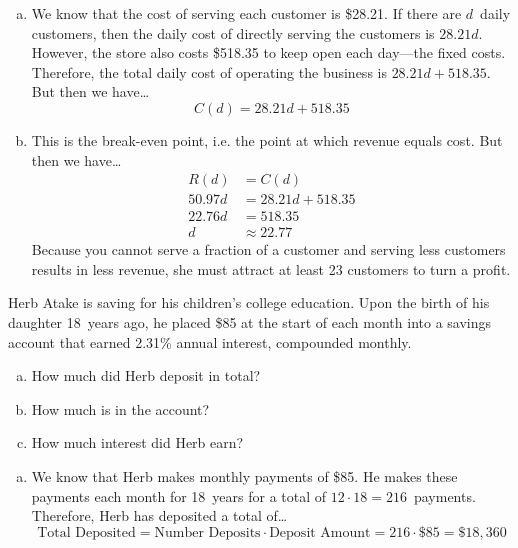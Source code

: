 \documentclass[12pt,letterpaper]{exam}
\begin{document}
\begin{questions}
{\begin{enumerate}[(a)]
\item We know that the cost of serving each customer is \$28.21. If there are $d$~daily customers, then the daily cost of directly serving the customers is $28.21d$. However, the store also costs \$518.35 to keep open each day---the fixed costs. Therefore, the total daily cost of operating the business is $28.21d + 518.35$. But then we have\dots
	\[
	C(d)= 28.21d + 518.35
	\] \pspace

\item This is the break-even point, i.e. the point at which revenue equals cost. But then we have\dots
	\[
	\begin{aligned}
	R(d)&= C(d) \\[0.3cm]
	50.97d&= 28.21d + 518.35 \\[0.3cm]
	22.76d&= 518.35 \\[0.3cm]
	d&\approx 22.77
	\end{aligned}
	\]
Because you cannot serve a fraction of a customer and serving less customers results in less revenue, she must attract at least 23 customers to turn a profit. 
\end{enumerate}
}



\newpage
\question[10] Herb Atake is saving for his children's college education. Upon the birth of his daughter 18~years ago, he placed \$85 at the start of each month into a savings account that earned 2.31\% annual interest, compounded monthly. 
	\begin{enumerate}[(a)]
	\item How much did Herb deposit in total?
	\item How much is in the account?
	\item How much interest did Herb earn?
	\end{enumerate} \pspace

{\itshape
\sol 
\begin{enumerate}[(a)]
\item We know that Herb makes monthly payments of \$85. He makes these payments each month for 18~years for a total of $12 \cdot 18= 216$~payments. Therefore, Herb has deposited a total of\dots
	\[
	\text{Total Deposited}= \text{Number Deposits} \cdot \text{Deposit Amount}= 216 \cdot \$85= \$18,\!360
	\] \pspace


\end{enumerate}}
\end{questions}
\end{document}
